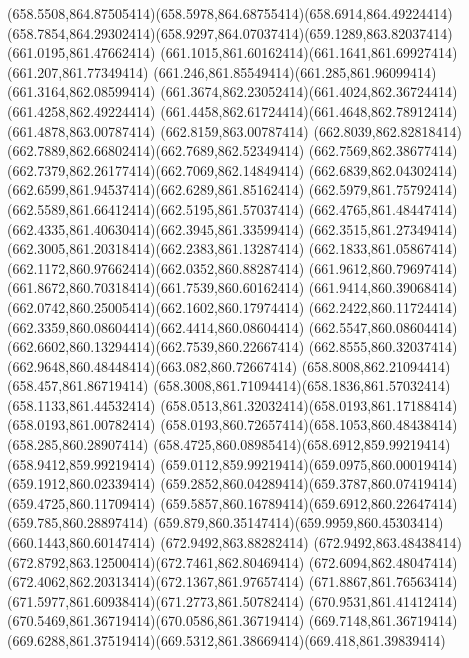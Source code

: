 {{	\curveto(658.5508,864.87505414)(658.5978,864.68755414)(658.6914,864.49224414)
	\curveto(658.7854,864.29302414)(658.9297,864.07037414)(659.1289,863.82037414)
	\lineto(661.0195,861.47662414)
	\curveto(661.1015,861.60162414)(661.1641,861.69927414)(661.207,861.77349414)
	\curveto(661.246,861.85549414)(661.285,861.96099414)(661.3164,862.08599414)
	\curveto(661.3674,862.23052414)(661.4024,862.36724414)(661.4258,862.49224414)
	\curveto(661.4458,862.61724414)(661.4648,862.78912414)(661.4878,863.00787414)
	\lineto(662.8159,863.00787414)
	\curveto(662.8039,862.82818414)(662.7889,862.66802414)(662.7689,862.52349414)
	\curveto(662.7569,862.38677414)(662.7379,862.26177414)(662.7069,862.14849414)
	\curveto(662.6839,862.04302414)(662.6599,861.94537414)(662.6289,861.85162414)
	\curveto(662.5979,861.75792414)(662.5589,861.66412414)(662.5195,861.57037414)
	\curveto(662.4765,861.48447414)(662.4335,861.40630414)(662.3945,861.33599414)
	\curveto(662.3515,861.27349414)(662.3005,861.20318414)(662.2383,861.13287414)
	\curveto(662.1833,861.05867414)(662.1172,860.97662414)(662.0352,860.88287414)
	\curveto(661.9612,860.79697414)(661.8672,860.70318414)(661.7539,860.60162414)
	\curveto(661.9414,860.39068414)(662.0742,860.25005414)(662.1602,860.17974414)
	\curveto(662.2422,860.11724414)(662.3359,860.08604414)(662.4414,860.08604414)
	\curveto(662.5547,860.08604414)(662.6602,860.13294414)(662.7539,860.22667414)
	\curveto(662.8555,860.32037414)(662.9648,860.48448414)(663.082,860.72667414)
	\closepath
	\moveto(658.8008,862.21094414)
	\lineto(658.457,861.86719414)
	\curveto(658.3008,861.71094414)(658.1836,861.57032414)(658.1133,861.44532414)
	\curveto(658.0513,861.32032414)(658.0193,861.17188414)(658.0193,861.00782414)
	\curveto(658.0193,860.72657414)(658.1053,860.48438414)(658.285,860.28907414)
	\curveto(658.4725,860.08985414)(658.6912,859.99219414)(658.9412,859.99219414)
	\curveto(659.0112,859.99219414)(659.0975,860.00019414)(659.1912,860.02339414)
	\curveto(659.2852,860.04289414)(659.3787,860.07419414)(659.4725,860.11709414)
	\curveto(659.5857,860.16789414)(659.6912,860.22647414)(659.785,860.28897414)
	\curveto(659.879,860.35147414)(659.9959,860.45303414)(660.1443,860.60147414)
	\closepath
	\moveto(672.9492,863.88282414)
	\curveto(672.9492,863.48438414)(672.8792,863.12500414)(672.7461,862.80469414)
	\curveto(672.6094,862.48047414)(672.4062,862.20313414)(672.1367,861.97657414)
	\curveto(671.8867,861.76563414)(671.5977,861.60938414)(671.2773,861.50782414)
	\curveto(670.9531,861.41412414)(670.5469,861.36719414)(670.0586,861.36719414)
	\lineto(669.7148,861.36719414)
	\curveto(669.6288,861.37519414)(669.5312,861.38669414)(669.418,861.39839414)
}}
